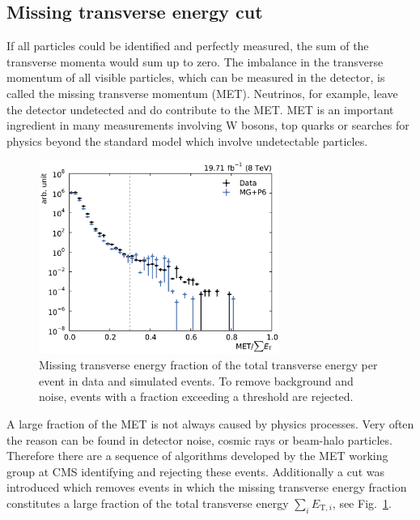 \subsection{Missing transverse energy cut}

If all particles could be identified and perfectly measured, the sum of the
transverse momenta would sum up to zero. The imbalance in the transverse
momentum of all visible particles, which can be measured in the detector, is
called the missing transverse momentum (MET). Neutrinos, for example, leave the
detector undetected and do contribute to the MET. MET is an important ingredient
in many measurements involving W bosons, top quarks or searches for physics
beyond the standard model which involve undetectable particles. 

\begin{figure}[htbp]
    \centering
    \includegraphics[width=0.7\textwidth]{figures/measurement/metoversumet.pdf}
    \caption[Missing transverse energy distribution]{Missing transverse energy
    fraction of the total transverse energy per event in data and simulated
    events. To remove background and noise, events with a fraction exceeding a
    threshold are rejected. }
    \label{fig:mc:met_fraction}
\end{figure}

A large fraction of the MET is not always caused by physics processes. Very
often the reason can be found in detector noise, cosmic rays or beam-halo
particles. Therefore there are a sequence of algorithms developed by the MET
working group at CMS identifying and rejecting these events. Additionally a cut
was introduced which removes events in which the missing transverse energy
fraction \met constitutes a large fraction of the total transverse energy $\sum_i
E_{\mathrm{T},i}$, see Fig.~\ref{fig:mc:met_fraction}.

